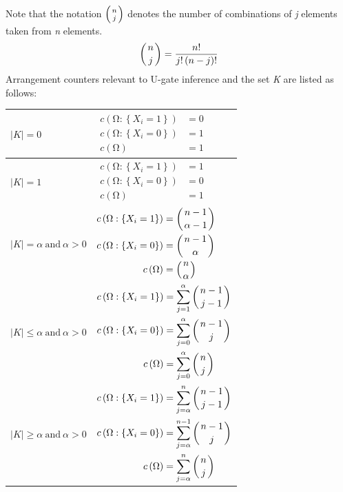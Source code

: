 \documentclass{article}
\numberwithin{equation}{section}
\numberwithin{figure}{section}
\numberwithin{table}{section}
\begin{document}
\noindent Note that the notation $\left(\genfrac{}{}{0pt}{}{n}{j}\right)$ denotes the number of combinations of \textit{j} elements taken from \textit{n} elements.
\[\left(\genfrac{}{}{0pt}{}{n}{j}\right)=\frac{n!}{j!\left(n-j\right)!}\] 
Arrangement counters relevant to U-gate inference and the set \textit{K} are listed as follows:
\begin{center}
\begin{tabular}{l|l}
$\left|K\right|=0$ &
  $\begin{aligned}
  c\left(\mathrm{\Omega }:\left\{X_i=1\right\}\right)&=0\\
  c\left(\mathrm{\Omega }:\left\{X_i=0\right\}\right)&=1\\
  c\left(\mathrm{\Omega }\right)&=1
  \end{aligned}$\\
\hline
$\left|K\right|=1$ &
  $\begin{aligned}
  c\left(\mathrm{\Omega }:\left\{X_i=1\right\}\right)&=1\\
  c\left(\mathrm{\Omega }:\left\{X_i=0\right\}\right)&=0\\
  c\left(\mathrm{\Omega }\right)&=1
  \end{aligned}$\\
\hline
$\left|K\right|=\alpha \ \mathrm{and}\ \alpha >0$ &
  $\begin{aligned}
  c\left(\mathrm{\Omega }:\left\{X_i=1\right\}\right)&=\left(\genfrac{}{}{0pt}{}{n-1}{\alpha -1}\right)\\
  c\left(\mathrm{\Omega }:\left\{X_i=0\right\}\right)&=\left(\genfrac{}{}{0pt}{}{n-1}{\alpha }\right)\\
  c\left(\mathrm{\Omega }\right)&=\left(\genfrac{}{}{0pt}{}{n}{\alpha }\right)
  \end{aligned}$\\
\hline
$\left|K\right|\le \alpha \ \mathrm{and}\ \alpha >0$ &
  $\begin{aligned}
  c\left(\mathrm{\Omega }:\left\{X_i=1\right\}\right)&=\sum^{\alpha }_{j=1}{\left(\genfrac{}{}{0pt}{}{n-1}{j-1}\right)}\\
  c\left(\mathrm{\Omega }:\left\{X_i=0\right\}\right)&=\sum^{\alpha }_{j=0}{\left(\genfrac{}{}{0pt}{}{n-1}{j}\right)}\\
  c\left(\mathrm{\Omega }\right)&=\sum^{\alpha }_{j=0}{\left(\genfrac{}{}{0pt}{}{n}{j}\right)}
  \end{aligned}$\\
\hline
$\left|K\right|\ge \alpha \ \mathrm{and}\ \alpha >0$ &
  $\begin{aligned}
  c\left(\mathrm{\Omega }:\left\{X_i=1\right\}\right)&=\sum^n_{j=\alpha }{\left(\genfrac{}{}{0pt}{}{n-1}{j-1}\right)}\\
  c\left(\mathrm{\Omega }:\left\{X_i=0\right\}\right)&=\sum^{n-1}_{j=\alpha }{\left(\genfrac{}{}{0pt}{}{n-1}{j}\right)}\\
  c\left(\mathrm{\Omega }\right)&=\sum^n_{j=\alpha }{\left(\genfrac{}{}{0pt}{}{n}{j}\right)}
  \end{aligned}$
\end{tabular}
\end{center}
\end{document}
